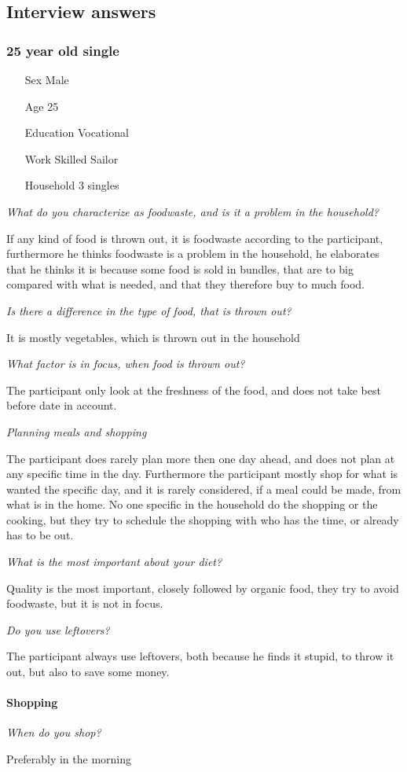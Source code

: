 \subsection{Interview answers}
\subsubsection{25 year old single}
\begin{itemize}
  \item[Sex] Male
  \item[Age] 25
  \item[Education] Vocational
  \item[Work] Skilled Sailor
  \item[Household] 3 singles
\end{itemize}
\emph{What do you characterize as foodwaste, and is it a problem in the household?}

If any kind of food is thrown out, it is foodwaste according to the participant, furthermore he thinks foodwaste is a problem in the household, he elaborates that he thinks it is because some food is sold in bundles, that are to big compared with what is needed, and that they therefore buy to much food.

\emph{Is there a difference in the type of food, that is thrown out?}

It is mostly vegetables, which is thrown out in the household

\emph{What factor is in focus, when food is thrown out?}

The participant only look at the freshness of the food, and does not take best before date in account.

\emph{Planning meals and shopping}

The participant does rarely plan more then one day ahead, and does not plan at any specific time in the day. Furthermore the participant mostly shop for what is wanted the specific day, and it is rarely considered, if a meal could be made, from what is in the home. No one specific in the household do the shopping or the cooking, but they try to schedule the shopping with who has the time, or already has to be out.

\emph{What is the most important about your diet?}

Quality is the most important, closely followed by organic food, they try to avoid foodwaste, but it is not in focus.

\emph{Do you use leftovers?}

The participant always use leftovers, both because he finds it stupid, to throw it out, but also to save some money.
\paragraph{Shopping}
\emph{When do you shop?}

Preferably in the morning